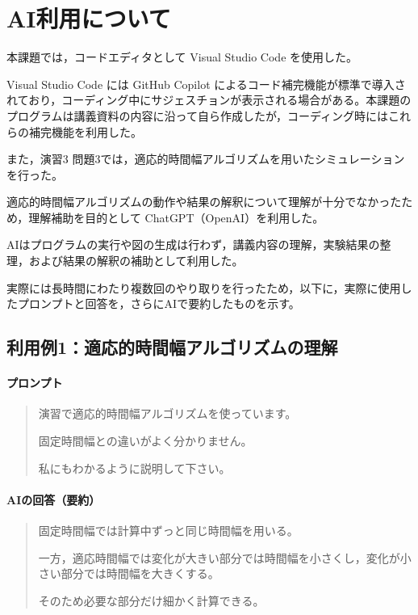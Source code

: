\documentclass[uplatex,dvipdfmx]{jsarticle}
\begin{document}
\section{AI利用について}

本課題では，コードエディタとして Visual Studio Code を使用した。

Visual Studio Code には GitHub Copilot によるコード補完機能が標準で導入されており，コーディング中にサジェスチョンが表示される場合がある。本課題のプログラムは講義資料の内容に沿って自ら作成したが，コーディング時にはこれらの補完機能を利用した。

また，演習3 問題3では，適応的時間幅アルゴリズムを用いたシミュレーションを行った。

適応的時間幅アルゴリズムの動作や結果の解釈について理解が十分でなかったため，理解補助を目的として ChatGPT（OpenAI）を利用した。

AIはプログラムの実行や図の生成は行わず，講義内容の理解，実験結果の整理，および結果の解釈の補助として利用した。

実際には長時間にわたり複数回のやり取りを行ったため，以下に，実際に使用したプロンプトと回答を，さらにAIで要約したものを示す。

\subsection*{利用例1：適応的時間幅アルゴリズムの理解}

\paragraph{プロンプト}

\begin{quote}
演習で適応的時間幅アルゴリズムを使っています。

固定時間幅との違いがよく分かりません。

私にもわかるように説明して下さい。
\end{quote}

\paragraph{AIの回答（要約）}

\begin{quote}
固定時間幅では計算中ずっと同じ時間幅を用いる。

一方，適応時間幅では変化が大きい部分では時間幅を小さくし，変化が小さい部分では時間幅を大きくする。

そのため必要な部分だけ細かく計算できる。
\end{quote}
\end{document}
